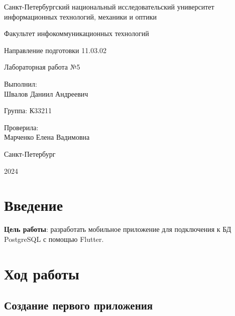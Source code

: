 \documentclass[a4paper, 14pt]{extarticle}
\begin{document}
\begin{titlepage}
  \vspace{0pt plus2fill}
  \noindent

  \vspace{0pt plus6fill}
  \begin{center}
    Санкт-Петербургский национальный исследовательский университет
    информационных технологий, механики и оптики

    \vspace{0pt plus3fill}

    Факультет инфокоммуникационных технологий

    Направление подготовки 11.03.02

    \vspace{0pt plus2fill}

    Лабораторная работа №5
  \end{center}

  \vspace{0pt plus6fill}
  \begin{flushright}
    Выполнил: \\
    Швалов Даниил Андреевич

    Группа: К33211

    Проверила: \\
    Марченко Елена Вадимовна
  \end{flushright}

  \vspace{0pt plus5fill}
  \begin{center}
    Санкт-Петербург

    2024
  \end{center}
\end{titlepage}

\section{Введение}

\textbf{Цель работы}: разработать мобильное приложение для подключения к БД
\foreignlanguage{english}{PostgreSQL} с помощью Flutter.

\section{Ход работы}

\subsection*{Создание первого приложения}
\end{document}
